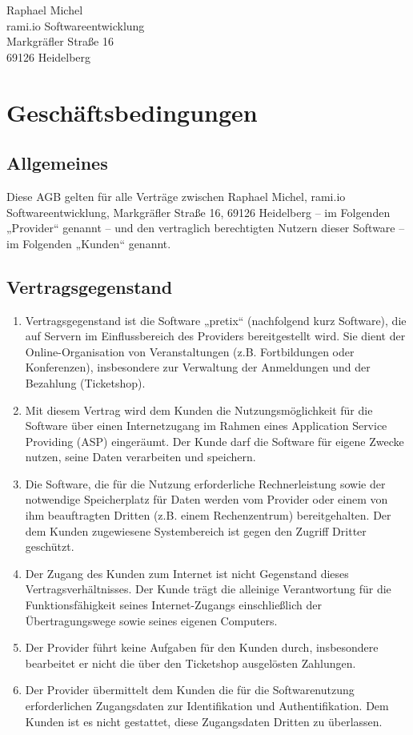 \documentclass{terms}
\begin{document}
\maketitle

\begin{center}
Raphael Michel\\
rami.io Softwareentwicklung\\
Markgräfler Straße 16\\
69126 Heidelberg
\end{center}
\sloppy

\section{Geschäftsbedingungen}
\subsection{Allgemeines}
Diese AGB gelten für alle Verträge zwischen Raphael Michel, rami.io Softwareentwicklung, Markgräfler Straße 16, 69126 Heidelberg
– im Folgenden „Provider“ genannt – und den vertraglich berechtigten Nutzern dieser Software – im Folgenden „Kunden“ genannt.

\subsection{Vertragsgegenstand}
\begin{enumerate}
\item Vertragsgegenstand ist die Software „pretix“ (nachfolgend kurz Software), die auf Servern im Einflussbereich des Providers bereitgestellt wird. Sie dient der Online-Organisation von Veranstaltungen (z.B. Fortbildungen oder Konferenzen), insbesondere zur Verwaltung der Anmeldungen und der Bezahlung (Ticketshop).
\item Mit diesem Vertrag wird dem Kunden die Nutzungsmöglichkeit für die Software über einen Internetzugang im Rahmen eines Application Service Providing (ASP) eingeräumt. Der Kunde darf die Software für eigene Zwecke nutzen, seine Daten verarbeiten und speichern.
\item Die Software, die für die Nutzung erforderliche Rechnerleistung sowie der notwendige Speicherplatz für Daten werden vom Provider oder einem von ihm beauftragten Dritten (z.B. einem Rechenzentrum) bereitgehalten. Der dem Kunden zugewiesene Systembereich ist gegen den Zugriff Dritter geschützt.
\item Der Zugang des Kunden zum Internet ist nicht Gegenstand dieses Vertragsverhältnisses. Der Kunde trägt die alleinige Verantwortung für die Funktionsfähigkeit seines Internet-Zugangs einschließlich der Übertragungswege sowie seines eigenen Computers.
\item Der Provider führt keine Aufgaben für den Kunden durch, insbesondere bearbeitet er nicht die über den Ticketshop ausgelösten Zahlungen.
\item Der Provider übermittelt dem Kunden die für die Softwarenutzung erforderlichen Zugangsdaten zur Identifikation und Authentifikation. Dem Kunden ist es nicht gestattet, diese Zugangsdaten Dritten zu überlassen.
\end{enumerate}
\end{document}
